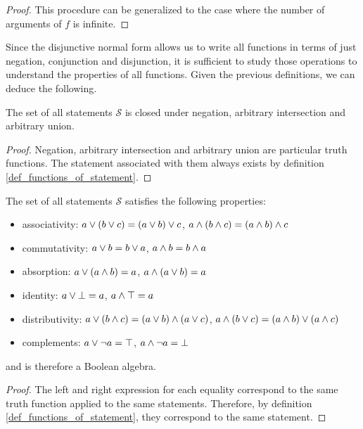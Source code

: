 \documentclass[11pt,letterpaper,fleqn]{memoir} %
\begin{document}
\begin{mathSection}
\begin{proof}
		This procedure can be generalized to the case where the number of arguments of $f$ is infinite.
	\end{proof}
\end{mathSection}

Since the disjunctive normal form allows us to write all functions in terms of just negation, conjunction and disjunction, it is sufficient to study those operations to understand the properties of all functions. Given the previous definitions, we can deduce the following.

\begin{mathSection}
	\begin{prop}
		The set of all statements $\mathcal{S}$ is closed under negation, arbitrary intersection and arbitrary union.
	\end{prop}
	\begin{proof}
		Negation, arbitrary intersection and arbitrary union are particular truth functions. The statement associated with them always exists by definition  \eqref{def_functions_of_statement}.
	\end{proof}
	\begin{prop}\label{boolean_properties}
		The set of all statements $\mathcal{S}$ satisfies the following properties:
		\begin{itemize}
			\item associativity: $a \vee (b \vee c) = (a \vee b) \vee c$, $a \wedge (b \wedge c) = (a \wedge b) \wedge c$
			\item commutativity: $a \vee b = b \vee a$, $a \wedge b = b \wedge a$
			\item absorption: $a \vee (a \wedge b) = a$, $a \wedge (a \vee b) = a$
			\item identity: $a \vee \bot = a
			$, $a \wedge \top = a$
			\item distributivity: $a \vee (b \wedge c) = (a \vee b) \wedge (a \vee c)$, $a \wedge (b \vee c) = (a \wedge b) \vee (a \wedge c)$
			\item complements: $a \vee \neg a = \top$, $a \wedge \neg a = \bot$
		\end{itemize}
		and is therefore a Boolean algebra.
	\end{prop}
	\begin{proof}
		The left and right expression for each equality correspond to the same truth function applied to the same statements. Therefore, by definition  \eqref{def_functions_of_statement}, they correspond to the same statement.
	\end{proof}
\end{mathSection}
\end{document}
